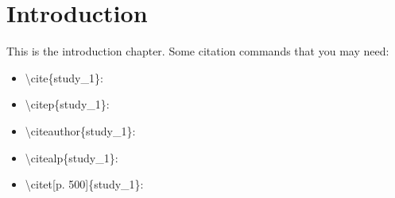 \chapter{Introduction}
\label{chapter:introduction}

This is the introduction chapter. Some citation commands that you may need:

\begin{itemize}
    \item \textbackslash{}cite\{study\_1\}: \cite{study_1}
    \item \textbackslash{}citep\{study\_1\}: \citep{study_1}
    \item \textbackslash{}citeauthor\{study\_1\}: \citeauthor{study_1}
    \item \textbackslash{}citealp\{study\_1\}: \citealp{study_1}
    \item \textbackslash{}citet[p. 500]\{study\_1\}: \citet[p. 500]{study_1}
\end{itemize}